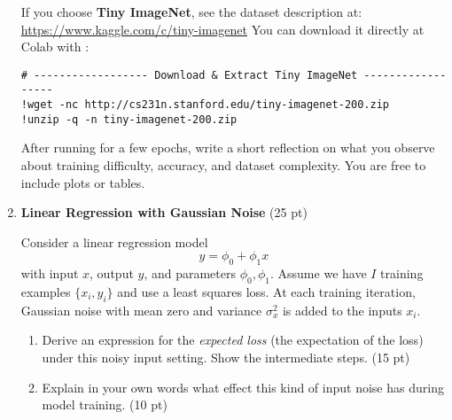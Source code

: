 \documentclass[12pt]{article}
\begin{document}
\begin{enumerate}[label=\textbf{Q\arabic*.}]
If you choose \textbf{Tiny ImageNet}, see the dataset description at:  
\url{https://www.kaggle.com/c/tiny-imagenet}  
You can download it directly at Colab with :
\begin{lstlisting}[style=mypython]
# ------------------ Download & Extract Tiny ImageNet ------------------
!wget -nc http://cs231n.stanford.edu/tiny-imagenet-200.zip
!unzip -q -n tiny-imagenet-200.zip
\end{lstlisting}

After running for a few epochs, write a short reflection on what you observe about training difficulty, accuracy, and dataset complexity. You are free to include plots or tables.


\item \textbf{Linear Regression with Gaussian Noise} (25 pt)

Consider a linear regression model
\[
y = \phi_0 + \phi_1 x
\]
with input $x$, output $y$, and parameters $\phi_0, \phi_1$. Assume we have $I$ training examples $\{x_i, y_i\}$ and use a least squares loss.  
At each training iteration, Gaussian noise with mean zero and variance $\sigma_x^2$ is added to the inputs $x_i$.  

\begin{enumerate}[label=(\alph*)]
    \item Derive an expression for the \emph{expected loss} (the expectation of the loss) under this noisy input setting. Show the intermediate steps. (15 pt)
    \item Explain in your own words what effect this kind of input noise has during model training. (10 pt)
\end{enumerate}

\end{enumerate}
\end{document}
